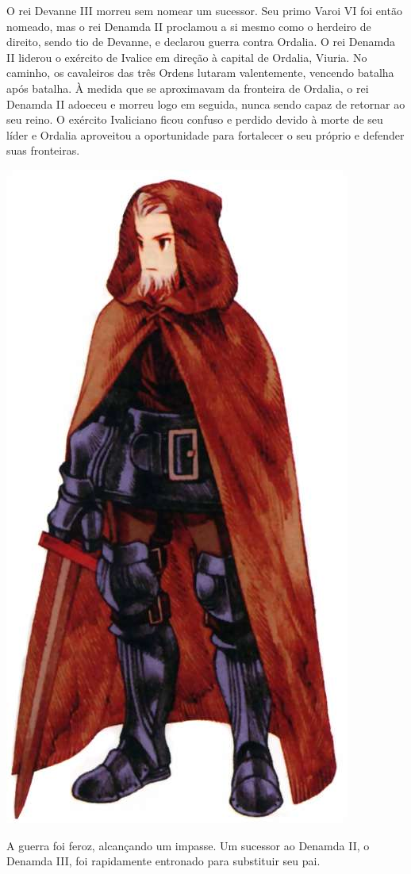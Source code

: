 O rei Devanne III morreu sem nomear um sucessor.
Seu primo Varoi VI foi então nomeado, mas o rei Denamda II proclamou a si mesmo como o herdeiro de direito, sendo tio de Devanne, e declarou guerra contra Ordalia.
O rei Denamda II liderou o exército de Ivalice em direção à capital de Ordalia, Viuria.
No caminho, os cavaleiros das três Ordens lutaram valentemente, vencendo batalha após batalha.
À medida que se aproximavam da fronteira de Ordalia, o rei Denamda II adoeceu e morreu logo em seguida, nunca sendo capaz de retornar ao seu reino. O exército Ivaliciano ficou confuso e perdido devido à morte de seu líder e Ordalia aproveitou a oportunidade para fortalecer o seu próprio e defender suas fronteiras. 
%
\vspace*{0.5cm}
%
\begin{center}\includegraphics[width=0.65\columnwidth]{./art/worldbook/cid.jpg}\end{center}
%
\vspace*{0.5cm}
%
A guerra foi feroz, alcançando um impasse.
Um sucessor ao Denamda II, o Denamda III, foi rapidamente entronado para substituir seu pai.
